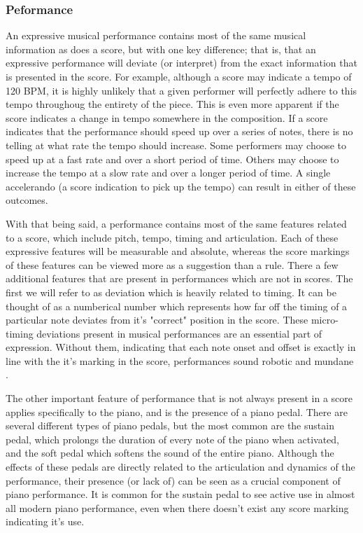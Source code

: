 \subsubsection{Peformance}
An expressive musical performance contains most of the same musical information as does a score, but with one key difference; that is, that an expressive performance will deviate (or interpret) from the exact information that is presented in the score. For example, although a score may indicate a tempo of 120 BPM, it is highly unlikely that a given performer will perfectly adhere to this tempo throughoug the entirety of the piece. This is even more apparent if the score indicates a change in tempo somewhere in the composition. If a score indicates that the performance should speed up over a series of notes, there is no telling at what rate the tempo should increase. Some performers may choose to speed up at a fast rate and over a short period of time. Others may choose to increase the tempo at a slow rate and over a longer period of time. A single accelerando (a score indication to pick up the tempo) can result in either of these outcomes. 

With that being said, a performance contains most of the same features related to a score, which include pitch, tempo, timing and articulation. Each of these expressive features will be measurable and absolute, whereas the score markings of these features can be viewed more as a suggestion than a rule. There a few additional features that are present in performances which are not in scores. The first we will refer to as deviation which is heavily related to timing. It  can be thought of as a numberical number which represents how far off the timing of a particular note deviates from it's "correct" position in the score. These micro-timing deviations present in musical performances are an essential part of expression. Without them, indicating that each note onset and offset is exactly in line with the it's marking in the score, performances sound robotic and mundane . 

The other important feature of performance that is not always present in a score applies specifically to the piano, and is the presence of a piano pedal. There are several different types of piano pedals, but the most common are the sustain pedal, which prolongs the duration of every note of the piano when activated, and the soft pedal which softens the sound of the entire piano. Although the effects of these pedals are directly related to the articulation and dynamics of the performance, their presence (or lack of) can be seen as a crucial component of piano performance. It is common for the sustain pedal to see active use in almost all modern piano performance, even when there doesn't exist any score marking indicating it's use. 

